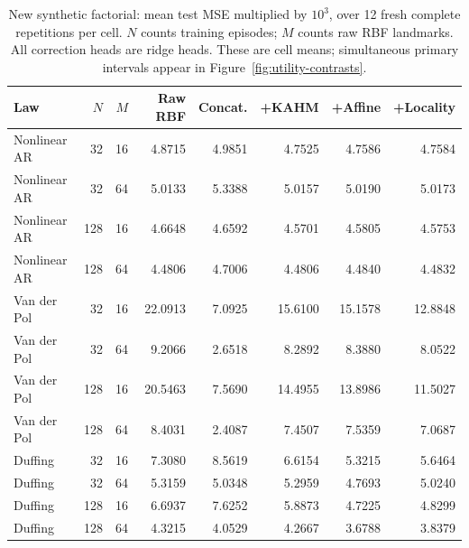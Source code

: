 \begin{table}[!htbp]
\centering\small\setlength{\tabcolsep}{4pt}
\caption{New synthetic factorial: mean test MSE multiplied by $10^3$, over 12 fresh complete repetitions per cell. $N$ counts training episodes; $M$ counts raw RBF landmarks. All correction heads are ridge heads. These are cell means; simultaneous primary intervals appear in Figure~\ref{fig:utility-contrasts}.}
\label{tab:utility-synthetic}
\begin{tabular}{lrrrrrrr}
\toprule
Law & $N$ & $M$ & Raw RBF & Concat. & +KAHM & +Affine & +Locality \\
\midrule
Nonlinear AR & 32 & 16 & 4.8715 & 4.9851 & 4.7525 & 4.7586 & 4.7584 \\
Nonlinear AR & 32 & 64 & 5.0133 & 5.3388 & 5.0157 & 5.0190 & 5.0173 \\
Nonlinear AR & 128 & 16 & 4.6648 & 4.6592 & 4.5701 & 4.5805 & 4.5753 \\
Nonlinear AR & 128 & 64 & 4.4806 & 4.7006 & 4.4806 & 4.4840 & 4.4832 \\
Van der Pol & 32 & 16 & 22.0913 & 7.0925 & 15.6100 & 15.1578 & 12.8848 \\
Van der Pol & 32 & 64 & 9.2066 & 2.6518 & 8.2892 & 8.3880 & 8.0522 \\
Van der Pol & 128 & 16 & 20.5463 & 7.5690 & 14.4955 & 13.8986 & 11.5027 \\
Van der Pol & 128 & 64 & 8.4031 & 2.4087 & 7.4507 & 7.5359 & 7.0687 \\
Duffing & 32 & 16 & 7.3080 & 8.5619 & 6.6154 & 5.3215 & 5.6464 \\
Duffing & 32 & 64 & 5.3159 & 5.0348 & 5.2959 & 4.7693 & 5.0240 \\
Duffing & 128 & 16 & 6.6937 & 7.6252 & 5.8873 & 4.7225 & 4.8299 \\
Duffing & 128 & 64 & 4.3215 & 4.0529 & 4.2667 & 3.6788 & 3.8379 \\
\bottomrule
\end{tabular}
\end{table}
